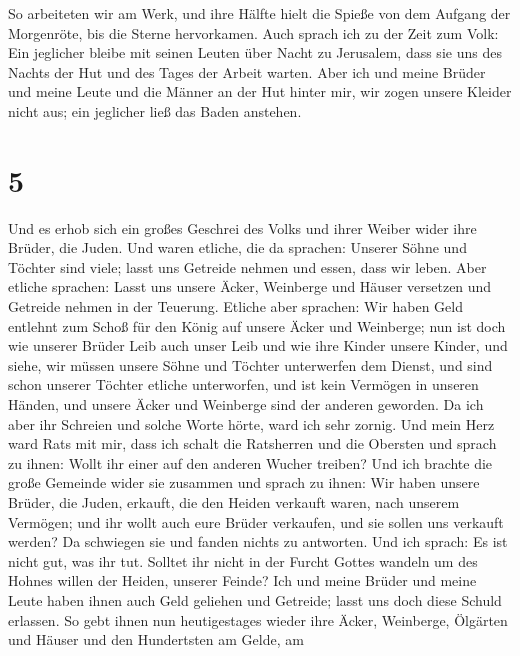 So arbeiteten wir am Werk, und ihre Hälfte hielt die
Spieße von dem Aufgang der Morgenröte, bis die Sterne hervorkamen.
 Auch sprach ich zu der Zeit zum Volk: Ein jeglicher
bleibe mit seinen Leuten über Nacht zu Jerusalem, dass sie uns des
Nachts der Hut und des Tages der Arbeit warten.  Aber ich
und meine Brüder und meine Leute und die Männer an der Hut hinter mir,
wir zogen unsere Kleider nicht aus; ein jeglicher ließ das Baden
anstehen.

\hypertarget{section-4}{%
\section{5}\label{section-4}}

 Und es erhob sich ein großes Geschrei des Volks und ihrer
Weiber wider ihre Brüder, die Juden.  Und waren etliche,
die da sprachen: Unserer Söhne und Töchter sind viele; lasst uns
Getreide nehmen und essen, dass wir leben.  Aber etliche
sprachen: Lasst uns unsere Äcker, Weinberge und Häuser versetzen und
Getreide nehmen in der Teuerung.  Etliche aber sprachen:
Wir haben Geld entlehnt zum Schoß für den König auf unsere Äcker und
Weinberge;  nun ist doch wie unserer Brüder Leib auch
unser Leib und wie ihre Kinder unsere Kinder, und siehe, wir müssen
unsere Söhne und Töchter unterwerfen dem Dienst, und sind schon unserer
Töchter etliche unterworfen, und ist kein Vermögen in unseren Händen,
und unsere Äcker und Weinberge sind der anderen geworden. 
Da ich aber ihr Schreien und solche Worte hörte, ward ich sehr zornig.
 Und mein Herz ward Rats mit mir, dass ich schalt die
Ratsherren und die Obersten und sprach zu ihnen: Wollt ihr einer auf den
anderen Wucher treiben? Und ich brachte die große Gemeinde wider sie
zusammen  und sprach zu ihnen: Wir haben unsere Brüder,
die Juden, erkauft, die den Heiden verkauft waren, nach unserem
Vermögen; und ihr wollt auch eure Brüder verkaufen, und sie sollen uns
verkauft werden? Da schwiegen sie und fanden nichts zu antworten.
 Und ich sprach: Es ist nicht gut, was ihr tut. Solltet
ihr nicht in der Furcht Gottes wandeln um des Hohnes willen der Heiden,
unserer Feinde?  Ich und meine Brüder und meine Leute
haben ihnen auch Geld geliehen und Getreide; lasst uns doch diese Schuld
erlassen.  So gebt ihnen nun heutigestages wieder ihre
Äcker, Weinberge, Ölgärten und Häuser und den Hundertsten am Gelde, am
